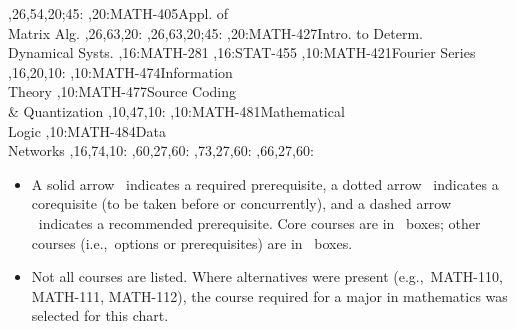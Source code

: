 \documentclass[9pt]{extarticle}
\begin{document}
\begin{chart}
  ,26,54,20;45:
,20:{MATH-405}{Appl. of\\Matrix Alg.}{}
  ,26,63,20:
  ,26,63,20;45:
,20:{MATH-427}{Intro. to Determ.\\Dynamical Systs.}{}
,16:{MATH-281}
,16:{STAT-455}
,10:{MATH-421}{Fourier Series}{}
  ,16,20,10:
,10:{MATH-474}{Information\\Theory}{}
,10:{MATH-477}{Source Coding\\\& Quantization}{}
  ,10,47,10:
,10:{MATH-481}{Mathematical\\Logic}{}
,10:{MATH-484}{Data\\Networks}{}
  ,16,74,10:
  ,60,27,60:
  ,73,27,60:
  ,66,27,60:
\end{chart}
\begin{center}
\begin{minipage}{6.0in}
\begin{itemize}
\item
A solid arrow \solidarrow\  indicates a required prerequisite,
a dotted arrow \dottedarrow\
indicates a corequisite (to be taken before or concurrently), and a
dashed arrow \dashedarrow\ indicates a recommended prerequisite.
Core courses are in \boldbox\ boxes;
other courses (i.e.,~options or prerequisites)
are in \lightbox\ boxes.
\item Not all courses are listed. Where alternatives were present
(e.g.,~MATH-110, MATH-111, MATH-112), the course required for a major in
mathematics was selected for this chart.
\end{itemize}
\end{minipage}
\end{center}
\end{document}

